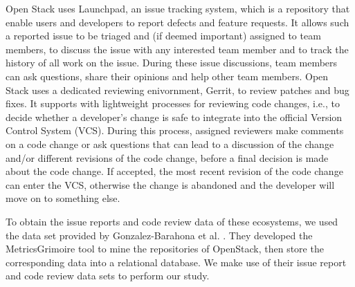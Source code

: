 \documentclass[ifip]{svmult}
\begin{document}
Open Stack uses Launchpad, an issue tracking system, which is a repository that enable
users and developers to report defects and feature requests. It allows such a reported issue to be triaged and (if  deemed
important) assigned to team members, to discuss the issue
with any interested team member and to track the history of
all work on the issue. During these issue discussions, team
members can ask questions, share their opinions and help
other team members. Open Stack uses a dedicated reviewing enivornment, 
Gerrit, to  review  patches  and  bug  fixes. It supports with 
lightweight processes for reviewing code changes, i.e., 
to decide whether a developer’s change is safe to
integrate into the official Version Control System (VCS). During this process, 
assigned  reviewers  make  comments
on a code change or ask questions that can lead to a discussion
of  the  change  and/or  different  revisions  of  the  code  change,
before  a  final  decision  is  made  about  the  code  change.  If
accepted, the most recent revision of the code change can enter
the VCS, otherwise the change is abandoned
and the developer will move on to something else.  



To obtain the issue reports and code review data of these ecosystems, we used the data set 
provided by Gonzalez-Barahona et al. \cite{contribution21}.  They  developed the  MetricsGrimoire tool to mine the repositories of
OpenStack, then store the corresponding data into a relational database. We make use of their issue
report and code review data sets \cite{contribution22} to perform our study.
\end{document}
